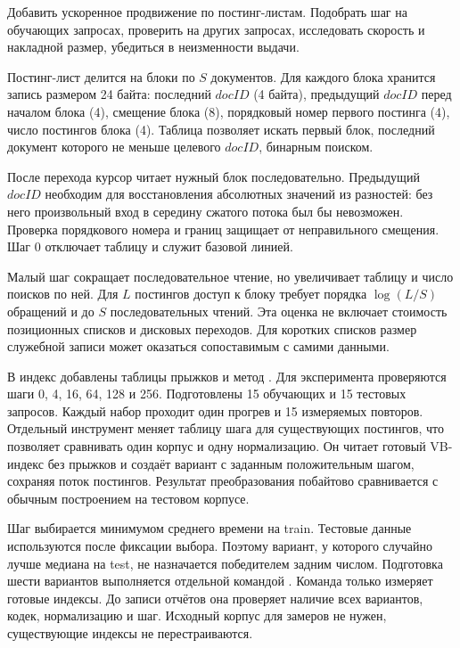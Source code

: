 \task
Добавить ускоренное продвижение по постинг-листам. Подобрать шаг
на обучающих запросах, проверить на других запросах, исследовать
скорость и накладной размер, убедиться в неизменности выдачи.

\method
Постинг-лист делится на блоки по \(S\) документов. Для каждого блока
хранится запись размером 24 байта: последний \(docID\) (4 байта),
предыдущий \(docID\) перед началом блока (4), смещение блока (8),
порядковый номер первого постинга (4), число постингов блока (4).
Таблица позволяет искать первый блок, последний документ которого
не меньше целевого \(docID\), бинарным поиском.

После перехода курсор читает нужный блок последовательно. Предыдущий
\(docID\) необходим для восстановления абсолютных значений из разностей:
без него произвольный вход в середину сжатого потока был бы невозможен.
Проверка порядкового номера и границ защищает от неправильного смещения.
Шаг 0 отключает таблицу и служит базовой линией.

Малый шаг сокращает последовательное чтение, но увеличивает таблицу
и число поисков по ней. Для \(L\) постингов доступ к блоку требует
порядка \(\log(L/S)\) обращений и до \(S\) последовательных чтений.
Эта оценка не включает стоимость позиционных списков и дисковых
переходов. Для коротких списков размер служебной записи может
оказаться сопоставимым с самими данными.

\journal
В индекс добавлены таблицы прыжков и метод .
Для эксперимента проверяются шаги 0, 4, 16, 64, 128 и 256.
Подготовлены 15 обучающих и 15 тестовых запросов. Каждый набор
проходит один прогрев и 15 измеряемых повторов. Отдельный инструмент
меняет таблицу шага для существующих постингов, что позволяет
сравнивать один корпус и одну нормализацию. Он читает готовый VB-индекс
без прыжков и создаёт вариант с заданным положительным шагом,
сохраняя поток постингов. Результат преобразования побайтово
сравнивается с обычным построением на тестовом корпусе.

Шаг выбирается минимумом среднего времени на train. Тестовые данные
используются после фиксации выбора. Поэтому вариант, у которого
случайно лучше медиана на test, не назначается победителем задним числом.
Подготовка шести вариантов выполняется отдельной командой
. Команда  только измеряет
готовые индексы. До записи отчётов она проверяет наличие всех
вариантов, кодек, нормализацию и шаг. Исходный корпус для замеров
не нужен, существующие индексы не перестраиваются.

